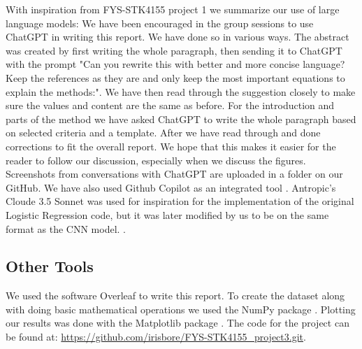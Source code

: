 With inspiration from FYS-STK4155 project 1 \cite{bore2023fysstk4155project1} we summarize our use of large language models: 
We have been encouraged in the group sessions to use ChatGPT \cite{openai2023chatgpt} in writing this report. We have done so in various ways. The abstract was created by first writing the whole paragraph, then sending it to ChatGPT with the prompt "Can you rewrite this with better and more concise language? Keep the references as they are and only keep the most important equations to explain the methods:". We have then read through the suggestion closely to make sure the values and content are the same as before. For the introduction and parts of the method we have asked ChatGPT to write the whole paragraph based on selected criteria and a template. After we have read through and done corrections to fit the overall report. We hope that this makes it easier for the reader to follow our discussion, especially when we discuss the figures. Screenshots from conversations with ChatGPT are uploaded in a folder on our GitHub. We have also used Github Copilot as an integrated tool \cite{github_copilot}. Antropic's Cloude 3.5 Sonnet was used for inspiration for the implementation of the original Logistic Regression code, but it was later modified by us to be on the same format as the CNN model. \cite{anthropic_claude_3_5_sonnet}. 


\subsection{Other Tools}

We used the software Overleaf to write this report. To create the dataset along with doing basic mathematical operations we used the NumPy package \cite{harris2020numpy}. Plotting our results was done with the Matplotlib package \cite{hunter-2007matplotlib}. The code for the project can be found at: \url{https://github.com/irisbore/FYS-STK4155_project3.git}.
